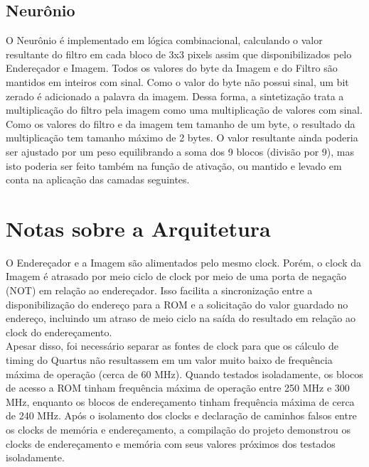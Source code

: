 \documentclass[12pt]{article}
\begin{document}
\subsection{Neurônio}

O Neurônio é implementado em lógica combinacional, calculando o valor resultante do filtro
em cada bloco de 3x3 pixels assim que disponibilizados pelo Endereçador e Imagem.
Todos os valores do byte da Imagem e do Filtro são mantidos em inteiros com sinal. Como o valor
do byte não possui sinal, um bit zerado é adicionado a palavra da imagem. Dessa forma,
a sintetização trata a multiplicação do filtro pela imagem como uma multiplicação de valores
com sinal.\\

Como os valores do filtro e da imagem tem tamanho de um byte, o resultado da multiplicação tem
tamanho máximo de 2 bytes. O valor resultante ainda poderia ser ajustado por um peso equilibrando
a soma dos 9 blocos (divisão por 9), mas isto poderia ser feito também na função de ativação,
ou mantido e levado em conta na aplicação das camadas seguintes.\\

\section{Notas sobre a Arquitetura}

O Endereçador e a Imagem são alimentados pelo mesmo clock. Porém, o clock da Imagem é atrasado
por meio ciclo de clock por meio de uma porta de negação (NOT) em relação ao endereçador.
Isso facilita a sincronização entre a disponibilização do endereço para a ROM e a solicitação
do valor guardado no endereço, incluindo um atraso de meio ciclo na saída do resultado em
relação ao clock do endereçamento.\\

Apesar disso, foi necessário separar as fontes de clock para que os cálculo de timing do
Quartus não resultassem em um valor muito baixo de frequência máxima de operação (cerca de 
60 MHz). Quando testados isoladamente, os blocos de acesso a ROM tinham frequência
máxima de operação entre 250 MHz e 300 MHz, enquanto os blocos de endereçamento tinham
frequência máxima de cerca de 240 MHz. Após o isolamento dos clocks e declaração de 
caminhos falsos entre os clocks de memória e endereçamento, a compilação do projeto demonstrou
os clocks de endereçamento e memória com seus valores próximos dos testados isoladamente.\\
\end{document}
